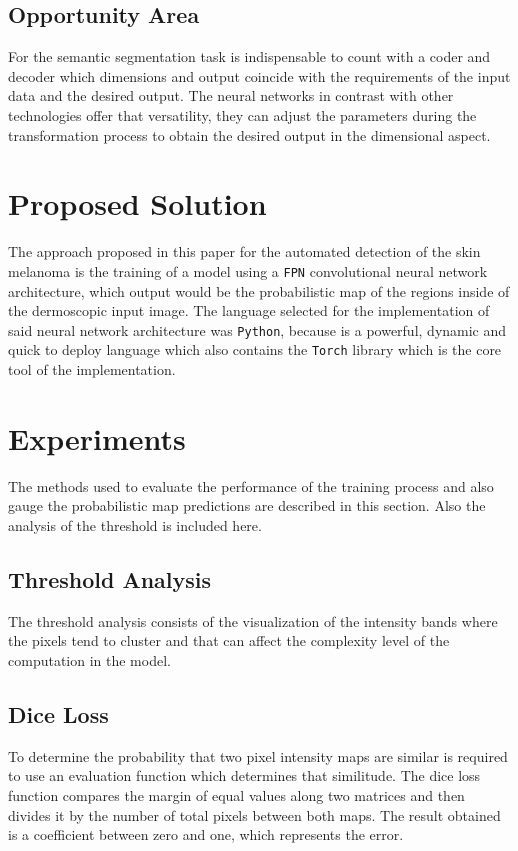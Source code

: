 \subsection{Opportunity Area}
For the semantic segmentation task is indispensable to count with a coder and decoder which dimensions and output coincide with the requirements of the input data and the desired output. The neural networks in contrast with other technologies offer that versatility, they can adjust the parameters during the transformation process to obtain the desired output in the dimensional aspect.  

\section{Proposed Solution}
The approach proposed in this paper for the automated detection of the skin melanoma is the training of a model using a \texttt{FPN} convolutional neural network architecture, which output would be the probabilistic map of the regions inside of the dermoscopic input image. The language selected for the implementation of said neural network architecture was \texttt{Python}, because is a powerful, dynamic and quick to deploy language which also contains the \texttt{Torch} library which is the core tool of the implementation.

\section{Experiments}
The methods used to evaluate the performance of the training process and also gauge the probabilistic map predictions are described in this section. Also the analysis of the threshold is included here.

\subsection{Threshold Analysis}
The threshold analysis consists of the visualization of the intensity bands where the pixels tend to cluster and that can affect the complexity level of the computation in the model.


\subsection{Dice Loss}
To determine the probability that two pixel intensity maps are similar is required to use an evaluation function which determines that similitude. The dice loss function compares the margin of equal values along two matrices and then divides it by the number of total pixels between both maps. The result obtained is a coefficient between zero and one, which represents the error.

